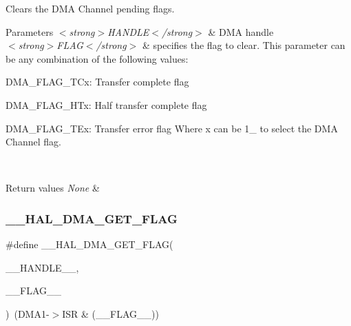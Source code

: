 Clears the D\+MA Channel pending flags. 


\begin{DoxyParams}{Parameters}
{\em $<$strong$>$\+H\+A\+N\+D\+L\+E$<$/strong$>$} & D\+MA handle \\
\hline
{\em $<$strong$>$\+F\+L\+A\+G$<$/strong$>$} & specifies the flag to clear. This parameter can be any combination of the following values\+: \begin{DoxyItemize}
\item D\+M\+A\+\_\+\+F\+L\+A\+G\+\_\+\+T\+Cx\+: Transfer complete flag \item D\+M\+A\+\_\+\+F\+L\+A\+G\+\_\+\+H\+Tx\+: Half transfer complete flag \item D\+M\+A\+\_\+\+F\+L\+A\+G\+\_\+\+T\+Ex\+: Transfer error flag Where x can be 1\+\_ to select the D\+MA Channel flag. \end{DoxyItemize}
\\
\hline
\end{DoxyParams}

\begin{DoxyRetVals}{Return values}
{\em None} & \\
\hline
\end{DoxyRetVals}
\mbox{\label{group___d_m_a_ex___exported___macros_ga798d4b3b3fbd32b95540967bb35b35be}} 
\subsubsection{\texorpdfstring{\+\_\+\+\_\+\+H\+A\+L\+\_\+\+D\+M\+A\+\_\+\+G\+E\+T\+\_\+\+F\+L\+AG}{\_\_HAL\_DMA\_GET\_FLAG}}
{\footnotesize\ttfamily \#define \+\_\+\+\_\+\+H\+A\+L\+\_\+\+D\+M\+A\+\_\+\+G\+E\+T\+\_\+\+F\+L\+AG(\begin{DoxyParamCaption}\item[{}]{\+\_\+\+\_\+\+H\+A\+N\+D\+L\+E\+\_\+\+\_\+,  }\item[{}]{\+\_\+\+\_\+\+F\+L\+A\+G\+\_\+\+\_\+ }\end{DoxyParamCaption})~(D\+M\+A1-\/$>$I\+SR \& (\+\_\+\+\_\+\+F\+L\+A\+G\+\_\+\+\_\+))}



